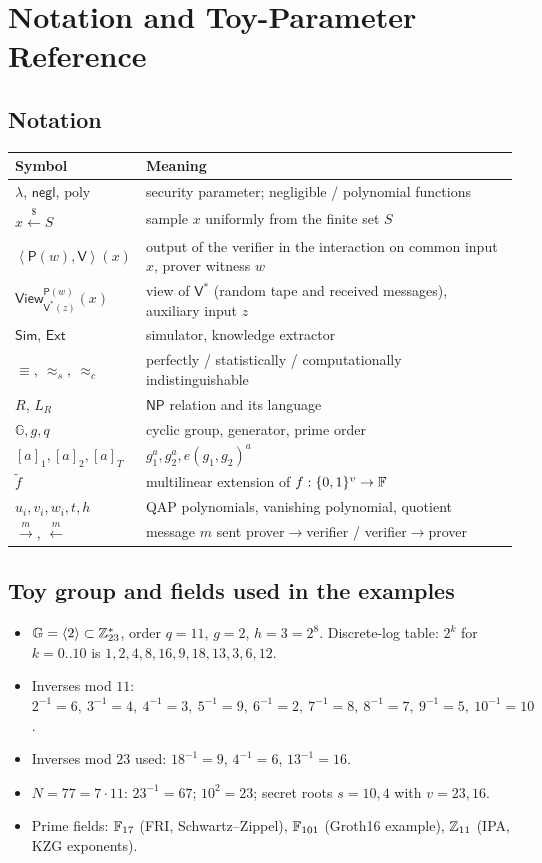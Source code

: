 \documentclass[11pt,a4paper]{report}
\theoremstyle{plain}
\theoremstyle{definition}
\theoremstyle{remark}
\newcommand{\GG}{\mathbb{G}}
\newcommand{\getsr}{\xleftarrow{\$}}
\newcommand{\negl}{\mathsf{negl}}
\newcommand{\poly}{\mathrm{poly}}
\newcommand{\Prv}{\mathsf{P}}\newcommand{\Ver}{\mathsf{V}}
\newcommand{\Sim}{\mathsf{Sim}}\newcommand{\Ext}{\mathsf{Ext}}
\newcommand{\view}{\mathsf{View}}
\newcommand{\NP}{\mathsf{NP}}\newcommand{\BPP}{\mathsf{BPP}}\newcommand{\IP}{\mathsf{IP}}
\newcommand{\pair}[2]{\left\langle #1,#2\right\rangle}
\newcommand{\inv}{^{-1}}
\newcommand{\Zs}[1]{\ZZ_{#1}^{*}}
\begin{document}
\appendix
\chapter{Notation and Toy-Parameter Reference}
\section{Notation}
\begin{center}\small
\begin{tabular}{@{}L{3.3cm}L{10.5cm}@{}}\toprule
Symbol & Meaning\\\midrule
$\lambda$, $\negl$, $\poly$ & security parameter; negligible / polynomial functions\\
$x\getsr S$ & sample $x$ uniformly from the finite set $S$\\
$\pair{\Prv(w)}{\Ver}(x)$ & output of the verifier in the interaction on common input $x$, prover witness $w$\\
$\view^{\Prv(w)}_{\Ver^*(z)}(x)$ & view of $\Ver^*$ (random tape and received messages), auxiliary input $z$\\
$\Sim$, $\Ext$ & simulator, knowledge extractor\\
$\equiv,\ \approx_s,\ \approx_c$ & perfectly / statistically / computationally indistinguishable\\
$R$, $L_R$ & $\NP$ relation and its language\\
$\GG,g,q$ & cyclic group, generator, prime order\\
$[a]_1,[a]_2,[a]_T$ & $g_1^a,g_2^a,e(g_1,g_2)^a$\\
$\tilde f$ & multilinear extension of $f:\{0,1\}^v\to\mathbb{F}$\\
$u_i,v_i,w_i,t,h$ & QAP polynomials, vanishing polynomial, quotient\\
$\xrightarrow{m}$, $\xleftarrow{m}$ & message $m$ sent prover$\to$verifier / verifier$\to$prover\\\bottomrule
\end{tabular}
\end{center}
\section{Toy group and fields used in the examples}
\begin{itemize}
\item $\GG=\langle2\rangle\subset\Zs{23}$, order $q=11$, $g=2$, $h=3=2^8$. Discrete-log table: $2^k$ for $k=0..10$ is $1,2,4,8,16,9,18,13,3,6,12$.
\item Inverses mod $11$: $2\inv=6,\ 3\inv=4,\ 4\inv=3,\ 5\inv=9,\ 6\inv=2,\ 7\inv=8,\ 8\inv=7,\ 9\inv=5,\ 10\inv=10$.
\item Inverses mod $23$ used: $18\inv=9$, $4\inv=6$, $13\inv=16$.
\item $N=77=7\cdot11$: $23\inv=67$; $10^2=23$; secret roots $s=10,4$ with $v=23,16$.
\item Prime fields: $\mathbb{F}_{17}$ (FRI, Schwartz--Zippel), $\mathbb{F}_{101}$ (Groth16 example), $\mathbb{Z}_{11}$ (IPA, KZG exponents).
\end{itemize}
\end{document}
